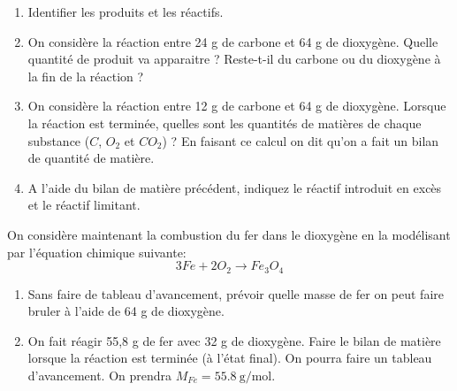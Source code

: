 \begin{enumerate}
\item Identifier les produits et les réactifs.
\item On considère la réaction entre 24 g de carbone et 64 g de dioxygène. Quelle quantité de produit va apparaitre ? Reste-t-il du carbone ou du dioxygène à la fin de la réaction ?
\item On considère la réaction entre 12 g de carbone et 64 g de dioxygène. Lorsque la réaction est terminée, quelles sont les quantités de matières de chaque substance ($C$, $O_2$ et $CO_2$) ? En faisant ce calcul on dit qu'on a fait un bilan de quantité de matière.
\item A l'aide du bilan de matière précédent, indiquez le réactif introduit en excès et le réactif limitant.
\end{enumerate}
On considère maintenant la combustion du fer dans le dioxygène en la modélisant par l'équation chimique suivante:$$3Fe+2O_2 \longrightarrow Fe_3O_4$$
\begin{enumerate}
\item Sans faire de tableau d'avancement, prévoir quelle masse de fer on peut faire bruler à l'aide de 64 g de dioxygène.
\item On fait réagir 55,8 g de fer avec 32 g de dioxygène. Faire le bilan de matière lorsque la réaction est terminée (à l'état final). On pourra faire un tableau d'avancement. On prendra $M_{Fe}=\SI{55,8}{\gram\per\mol}$.
\end{enumerate}















